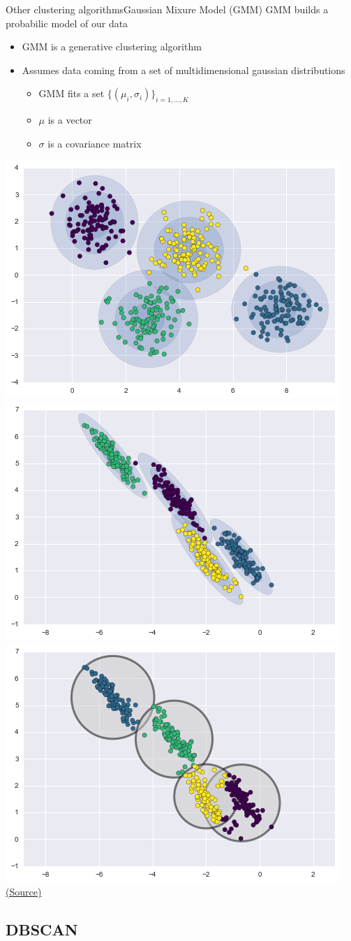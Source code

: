 \documentclass[10pt,compress]{beamer} %
\begin{document}
\begin{frame}{Other clustering algorithms}{Gaussian Mixure Model (GMM)}
	GMM builds a probabilic model of our data
	\begin{itemize}
		\item GMM is a generative clustering algorithm
		\item Assumes data coming from a set of multidimensional gaussian distributions
			\begin{itemize}
				\item GMM fits a set $\{(\mu_i, \sigma_i)\}_{i=1,\dots, K}$
				\item $\mu$ is a vector
				\item $\sigma$ is a covariance matrix
			\end{itemize}
	\end{itemize}

	\bigskip
	\centering \includegraphics[width=0.31\linewidth]{figs/gmm2.png}
	\includegraphics[width=0.31\linewidth]{figs/gmm3.png}
	\centering\includegraphics[width=0.31\linewidth]{figs/gmm1.png}\\
	\scriptsize\href{https://jakevdp.github.io/PythonDataScienceHandbook/05.12-gaussian-mixtures.html}{(Source)}
\end{frame}

\subsection{DBSCAN}
\end{document}
